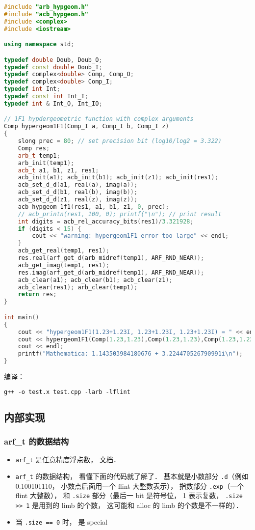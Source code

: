 \begin{lstlisting}[language=cpp, caption=test.cpp]
#include "arb_hypgeom.h"
#include "acb_hypgeom.h"
#include <complex>
#include <iostream>

using namespace std;

typedef double Doub, Doub_O;
typedef const double Doub_I;
typedef complex<double> Comp, Comp_O;
typedef complex<double> Comp_I;
typedef int Int;
typedef const int Int_I;
typedef int & Int_O, Int_IO;

// 1F1 hypdergeometric function with complex arguments
Comp hypergeom1F1(Comp_I a, Comp_I b, Comp_I z)
{
	slong prec = 80; // set precision bit (log10/log2 = 3.322)
	Comp res;
	arb_t temp1;
	arb_init(temp1);
	acb_t a1, b1, z1, res1;
	acb_init(a1); acb_init(b1); acb_init(z1); acb_init(res1);
	acb_set_d_d(a1, real(a), imag(a));
	acb_set_d_d(b1, real(b), imag(b));
	acb_set_d_d(z1, real(z), imag(z));
	acb_hypgeom_1f1(res1, a1, b1, z1, 0, prec);
	// acb_printn(res1, 100, 0); printf("\n"); // print result
	int digits = acb_rel_accuracy_bits(res1)/3.321928;
	if (digits < 15) {
		cout << "warning: hypergeom1F1 error too large" << endl;
	}
	acb_get_real(temp1, res1);
	res.real(arf_get_d(arb_midref(temp1), ARF_RND_NEAR));
	acb_get_imag(temp1, res1);
	res.imag(arf_get_d(arb_midref(temp1), ARF_RND_NEAR));
	acb_clear(a1); acb_clear(b1); acb_clear(z1);
    acb_clear(res1); arb_clear(temp1);
	return res;
}

int main()
{
	cout << "hypergeom1F1(1.23+1.23I, 1.23+1.23I, 1.23+1.23I) = " << endl;
	cout << hypergeom1F1(Comp(1.23,1.23),Comp(1.23,1.23),Comp(1.23,1.23))
    cout << endl;
	printf("Mathematica: 1.143503984180676 + 3.224470526790991i\n");
}
\end{lstlisting}
编译：
\begin{lstlisting}[language=makefile]
g++ -o test.x test.cpp -larb -lflint
\end{lstlisting}

\subsection{内部实现}
\subsubsection{arf_t 的数据结构}
\begin{itemize}
\item \verb|arf_t| 是任意精度浮点数， \href{https://arblib.org/arf.html}{文档}．
\item \verb|arf_t| 的数据结构， 看懂下面的代码就了解了． 基本就是小数部分 \verb|.d|（例如 0.100101110， 小数点后面用一个 flint 大整数表示）， 指数部分 \verb|.exp|（一个 flint 大整数）， 和 \verb|.size| 部分（最后一 bit 是符号位， 1 表示复数， \verb|.size >> 1| 是用到的 limb 的个数， 这可能和 alloc 的 limb 的个数是不一样的）．
\item 当 \verb|.size == 0| 时， 是 special
\end{itemize}

